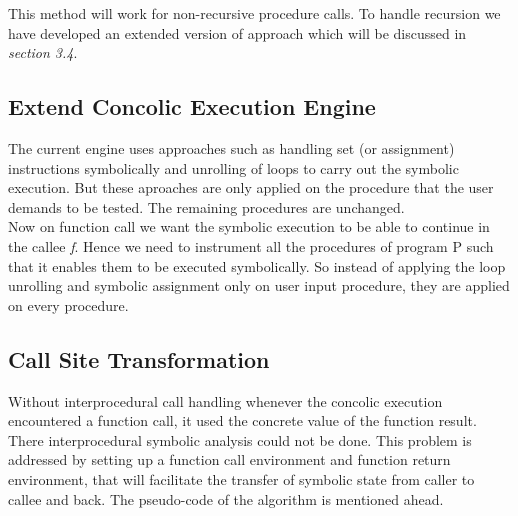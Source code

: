 \documentclass[12pt,oneside]{book}
\begin{document}
This method will work for non-recursive procedure calls. To handle recursion we have developed an extended version of approach which will be discussed in \textit{section 3.4}.\\


\subsection{Extend Concolic Execution Engine}
The current engine uses approaches such as handling set (or assignment) instructions symbolically and unrolling of loops to carry out the symbolic execution. But these aproaches are only applied on the procedure that the user demands to be tested. The remaining procedures are unchanged.\\
Now on function call we want the symbolic execution to be able to continue in the callee \textit{f}. Hence we need to instrument all the procedures of program P such that it enables them to be executed symbolically. So instead of applying the loop unrolling and symbolic assignment only on user input procedure, they are applied on every procedure.


\subsection{Call Site Transformation}
Without interprocedural call handling whenever the concolic execution encountered a function call, it used the concrete value of the function result. There interprocedural symbolic analysis could not be done. This problem is addressed by setting up a function call environment and function return environment, that will facilitate the transfer of symbolic state from caller to callee and back. The pseudo-code of the algorithm is mentioned ahead.\\
\end{document}
